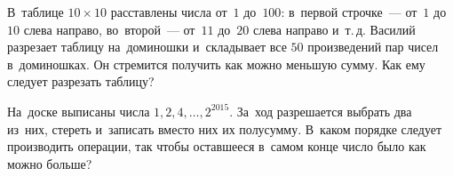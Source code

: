 \begin{problems}
\item
В~таблице $10 \times 10$ расставлены числа от~$1$ до~$100$:
в~первой строчке~--- от~$1$ до~$10$ слева направо,
во~второй~--- от~$11$ до~$20$ слева направо и~т.\,д.
Василий разрезает таблицу на~доминошки и~складывает все $50$ произведений пар
чисел в~доминошках.
Он стремится получить как можно меньшую сумму.
Как ему следует разрезать таблицу?

\item
На~доске выписаны числа $1, 2, 4, \ldots, 2^{2015}$.
За~ход разрешается выбрать два из~них, стереть и~записать вместо них их
полусумму.
В~каком порядке следует производить операции, так чтобы оставшееся в~самом
конце число было как можно больше?

\end{problems}

